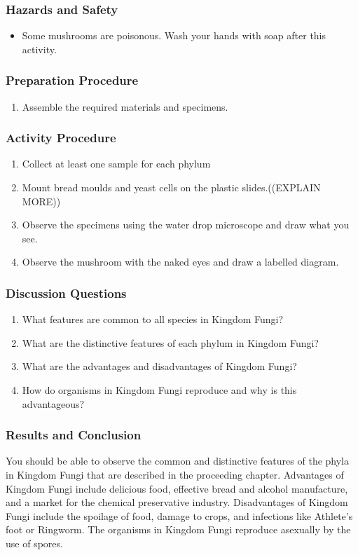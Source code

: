 \subsubsection*{Hazards and Safety}
\begin{itemize}
\item{Some mushrooms are poisonous. Wash your hands with soap after this activity.}
\end{itemize}

\subsubsection*{Preparation Procedure}
\begin{enumerate}
\item{Assemble the required materials and specimens.}
\end{enumerate}

\subsubsection*{Activity Procedure}
\begin{enumerate}
\item{Collect at least one sample for each phylum}
\item{Mount bread moulds and yeast cells on the plastic slides.((EXPLAIN MORE))}
\item{Observe the specimens using the water drop microscope and draw what you see.}
\item{Observe the mushroom with the naked eyes and draw a labelled diagram.}
\end{enumerate}

\subsubsection*{Discussion Questions}
\begin{enumerate}
\item{What features are common to all species in Kingdom Fungi?}
\item{What are the distinctive features of each phylum in Kingdom Fungi?}
\item{What are the advantages and disadvantages of Kingdom Fungi?}
\item{How do organisms in Kingdom Fungi reproduce and why is this advantageous?}
\end{enumerate}

\subsubsection*{Results and Conclusion}
You should be able to observe the common and distinctive features of the phyla in Kingdom Fungi that are described in the proceeding chapter. Advantages of Kingdom Fungi include delicious food, effective bread and alcohol manufacture, and a market for the chemical preservative industry. Disadvantages of Kingdom Fungi include the spoilage of food, damage to crops, and infections like Athlete's foot or Ringworm. The organisms in Kingdom Fungi reproduce asexually by the use of spores.

